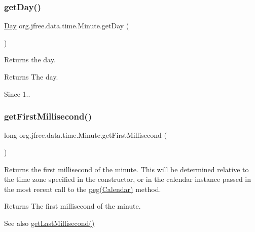 \subsubsection{\texorpdfstring{get\+Day()}{getDay()}}
{\footnotesize\ttfamily \mbox{\hyperlink{classorg_1_1jfree_1_1data_1_1time_1_1_day}{Day}} org.\+jfree.\+data.\+time.\+Minute.\+get\+Day (\begin{DoxyParamCaption}{ }\end{DoxyParamCaption})}

Returns the day.

\begin{DoxyReturn}{Returns}
The day.
\end{DoxyReturn}
\begin{DoxySince}{Since}
1.. 
\end{DoxySince}
\mbox{\label{classorg_1_1jfree_1_1data_1_1time_1_1_minute_a7f32248c4b7738436aa841d9abcb9114}} 
\subsubsection{\texorpdfstring{get\+First\+Millisecond()}{getFirstMillisecond()}\hspace{0.1cm}{\footnotesize\ttfamily [1/2]}}
{\footnotesize\ttfamily long org.\+jfree.\+data.\+time.\+Minute.\+get\+First\+Millisecond (\begin{DoxyParamCaption}{ }\end{DoxyParamCaption})}

Returns the first millisecond of the minute. This will be determined relative to the time zone specified in the constructor, or in the calendar instance passed in the most recent call to the \mbox{\hyperlink{classorg_1_1jfree_1_1data_1_1time_1_1_minute_ae7da5fb521ede7ac4a60122fb99266d3}{peg(\+Calendar)}} method.

\begin{DoxyReturn}{Returns}
The first millisecond of the minute.
\end{DoxyReturn}
\begin{DoxySeeAlso}{See also}
\mbox{\hyperlink{classorg_1_1jfree_1_1data_1_1time_1_1_minute_aa90d6502bb7d61c7fffdf9e43f2abdae}{get\+Last\+Millisecond()}} 
\end{DoxySeeAlso}
\mbox{\label{classorg_1_1jfree_1_1data_1_1time_1_1_minute_a8a3fb56ae6d437414bfa31873a229327}} 
